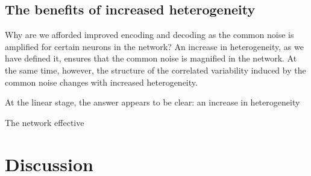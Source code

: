 \documentclass[11pt]{article}
\begin{document}
	\subsection{The benefits of increased heterogeneity}
	Why are we afforded improved encoding and decoding as the common noise is amplified for certain neurons in the network? An increase in heterogeneity, as we have defined it, ensures that the common noise is magnified in the network. At the same time, however, the structure of the correlated variability induced by the common noise changes with increased heterogeneity. 
	
	At the linear stage, the answer appears to be clear: an increase in heterogeneity
	
	The network effective

	\begin{figure}[b]
		\centering
		\caption{} 
	\end{figure}	
	\newpage
	\section{Discussion}
	

	\newpage
	\printbibliography

	\newpage
	
	\appendix
\end{document}
